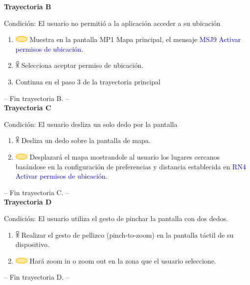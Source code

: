 \textbf{Trayectoria B}

Condición: El usuario no permitió a la aplicación acceder a su ubicación
\begin{enumerate}
    \item \includegraphics[width=0.0500\textwidth]{Figuras/sistema.png} Muestra en la pantalla MP1 Mapa principal, el mensaje {\textcolor{blue}{MSJ9 Activar permisos de ubicación}}. 
    \item \includegraphics[width=0.0150\textwidth]{Figuras/persona.png} Selecciona aceptar permiso de ubicación.
    \item Continua en el paso  3 de la trayectoria principal
\end{enumerate}
-- Fin trayectoria B. --\\

\textbf{Trayectoria C}

Condición: El usuario desliza un solo dedo por la pantalla
\begin{enumerate}
    \item \includegraphics[width=0.0150\textwidth]{Figuras/persona.png} Desliza un dedo sobre la pantalla de mapa.
    \item \includegraphics[width=0.0500\textwidth]{Figuras/sistema.png} Desplazará el mapa mostrandole al usuario los lugares cercanos basándose en la configuración de preferencias y distancia establecida en {\textcolor{blue}{RN4 Activar permisos de ubicación}}.
    \end{enumerate}
-- Fin trayectoria C. --\\


\textbf{Trayectoria D}

Condición: El usuario utiliza el gesto de pinchar la pantalla con dos dedos.
\begin{enumerate}
    \item \includegraphics[width=0.0150\textwidth]{Figuras/persona.png} Realizar el gesto de pellizco (pinch-to-zoom) en la pantalla táctil de su dispositivo.
    \item \includegraphics[width=0.0500\textwidth]{Figuras/sistema.png} Hará zoom in o zoom out en la zona que el usuario seleccione.
    \end{enumerate}
-- Fin trayectoria D. --\\


